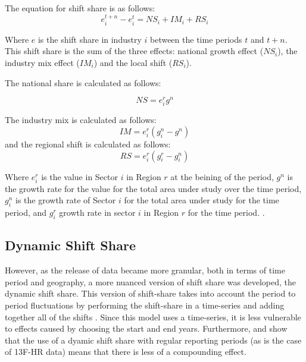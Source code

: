 The equation for shift share is as follows:
\begin{equation}
   e^{t+n}_{i} - e^{t}_{i} = NS_{i} + IM_{i} + RS_{i}
    \label{Eq:Shft_share}
\end{equation}

Where $e$ is the shift share in industry $i$ between the time periods $t$ and $t+n$.  This shift share is the sum of the three effects: national growth effect ($NS_{i}$), the industry mix effect ($IM_{i}$) and the local shift ($RS_{i}$). 

The national share is calculated as follows:

\begin{equation}
    NS = e^{r}_{i}g^{n}
    \label{Eq:NationalShare}
\end{equation}

The industry mix is calculated as follows:
\begin{equation}
    IM = e^{r}_{i}(g^{n}_{i} - g^{n})
    \label{Eq:IndustryMix}
\end{equation}
and the regional shift is calculated as follows: 
\begin{equation}
    RS =  e^{r}_{i}(g^{r}_{i} - g^{n}_{i})
    \label{Eq:RegionalShare}
\end{equation}

Where $e^{r}_{i}$ is the value in Sector $i$ in Region $r$ at the beining of the period, $g^{n}$ is the growth rate for the value for the total area under study over the time period, $g^{n}_{i}$ is the growth rate of Sector $i$ for the total area under study for the time period, and $g^{r}_{i}$ growth rate in sector $i$ in Region $r$ for the time period. \citep{Houston67}. 

\subsection{Dynamic Shift Share}

However, as the release of data became more granular, both in terms of time period and geography, a more nuanced version of shift share was developed, the dynamic shift share.  This version of shift-share takes into account the period to period fluctuations by performing the shift-share in a time-series and adding together all of the shifts \citep{BarffKnight88}.  Since this model uses a time-series, it is less vulnerable to effects caused by choosing the start and end years. Furthermore, \cite{BarffKnight88} and \cite{harris1994dynamic} show that the use of a dyamic shift share with regular reporting periods (as is the case of 13F-HR data) means that there is less of a compounding effect.   

